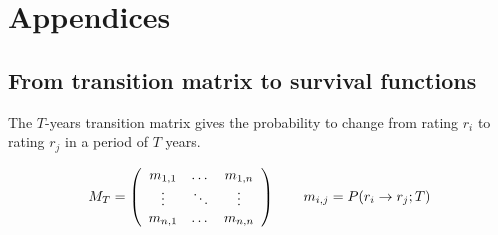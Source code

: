 \documentclass[a4paper,12pt,final]{article}
\begin{document}

\newpage
\appendix
\section{Appendices}

\subsection{From transition matrix to survival functions}
\label{ap:tmatrix}
The $T$-years transition matrix gives the probability to change from rating $r_i$ 
to rating $r_j$ in a period of $T$ years.

\begin{displaymath}
M_T = \left(
\begin{array}{ccc}
m_{1,1} & \dots  & m_{1,n} \cr
\vdots & \ddots & \vdots \cr
m_{n,1} & \dots  & m_{n,n} 
\end{array}
\right)
\qquad
m_{i,j} = P(r_i \to r_j;T)
\end{displaymath}
\end{document}
